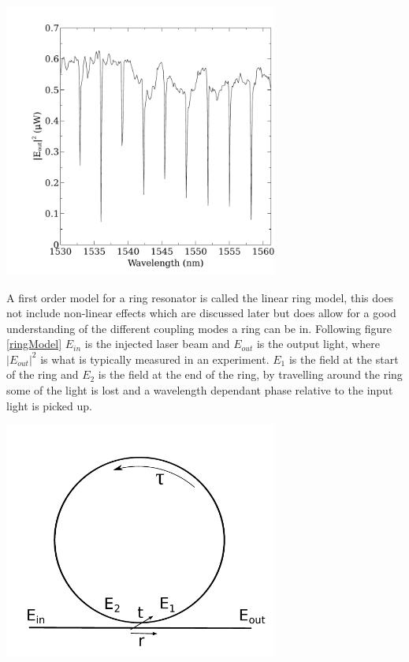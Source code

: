 \begingroup
\centering
    \includegraphics[width=9cm]{img/theory/ringTransmission.pdf}
 \label{ringResTrans}
\endgroup


A first order model for a ring resonator is called the linear ring model, this does not include non-linear effects which are discussed later but does allow for a good understanding of the different coupling modes a ring can be in. Following figure \ref{ringModel} $E_{in}$ is the injected laser beam and $E_{out}$ is the output light, where $|E_{out}|^2$ is what is typically measured in an experiment. $E_{1}$ is the field at the start of the ring and $E_2$ is the field at the end of the ring, by travelling around the ring some of the light is lost and a wavelength dependant phase relative to the input light is picked up.

\begingroup
\centering
    \includegraphics[width=9cm]{img/theory/ring.pdf} \label{ringModel}
\endgroup

